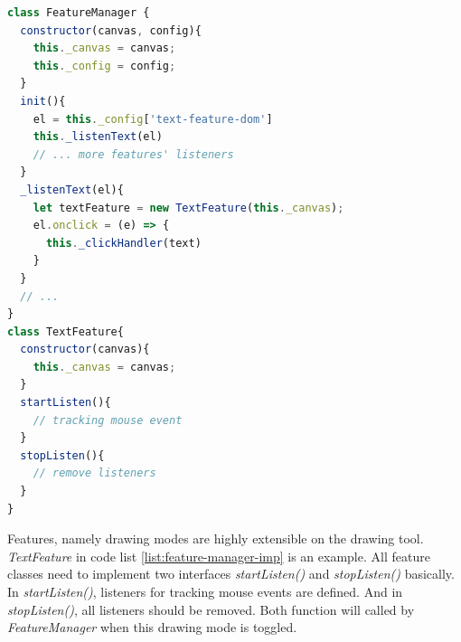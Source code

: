 \begin{lstlisting}[language=JavaScript, caption=Main process of FeatureManager, label={list:feature-manager-imp}]
class FeatureManager {
  constructor(canvas, config){
    this._canvas = canvas;
    this._config = config;
  }
  init(){
    el = this._config['text-feature-dom']
    this._listenText(el)
    // ... more features' listeners
  }
  _listenText(el){
    let textFeature = new TextFeature(this._canvas);
    el.onclick = (e) => { 
      this._clickHandler(text)
    }
  }
  // ...
}
class TextFeature{
  constructor(canvas){
    this._canvas = canvas;
  }
  startListen(){
    // tracking mouse event
  }
  stopListen(){
    // remove listeners
  }
}
\end{lstlisting}

Features, namely drawing modes are highly extensible on the drawing tool. \textit{TextFeature} in code list \ref{list:feature-manager-imp} is an example. All feature classes need to implement two interfaces \textit{startListen()} and \textit{stopListen()} basically. In \textit{startListen()}, listeners for tracking mouse events are defined. And in \textit{stopListen()}, all listeners should be removed. Both function will called by \textit{FeatureManager} when this drawing mode is toggled.